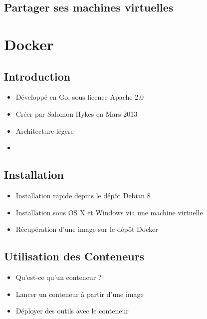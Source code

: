 \documentclass{beamer}
\begin{document}
    \subsection{Partager ses machines virtuelles}
    \begin{frame}
    \end{frame}

    
    \section{Docker}
    \subsection{Introduction}
    \begin{frame}
       \begin{itemize}
          \item{Développé en Go, sous licence Apache 2.0}
          \item{Créer par Salomon Hykes en Mars 2013}
          \item{Architecture légère}
          \item{}
       \end{itemize}
    \end{frame}

    \subsection{Installation}
    \begin{frame}
       \begin{itemize}
          \item{Installation rapide depuis le dépôt Debian 8}
          \item{Installation sous OS X et Windows via une machine virtuelle}
          \item{Récupération d'une image sur le dépôt Docker}
       \end{itemize}
    \end{frame}

    \subsection{Utilisation des Conteneurs}
    \begin{frame}
       \begin{itemize}
          \item{Qu'est-ce qu'un conteneur ?}
          \item{Lancer un conteneur à partir d'une image}
          \item{Déployer des outils avec le conteneur}
       \end{itemize}
       \begin{exampleblock}{}
          \em{}
       \end{exampleblock}
    \end{frame}
\end{document}
